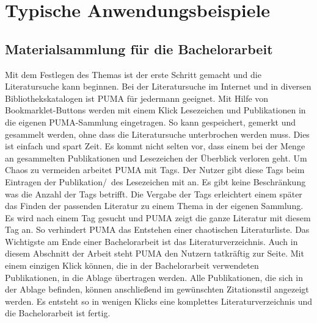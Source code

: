 \chapter{Typische Anwendungsbeispiele}

\section{Materialsammlung für die Bachelorarbeit}
Mit dem Festlegen des Themas ist der erste Schritt gemacht und die Literatursuche kann beginnen. Bei der Literatursuche im Internet und in diversen Bibliothekskatalogen ist PUMA für jedermann geeignet. Mit Hilfe von Bookmarklet-Buttons werden mit einem Klick Lesezeichen und Publikationen in die eigenen PUMA-Sammlung eingetragen. So kann gespeichert, gemerkt und gesammelt werden, ohne dass die Literatursuche unterbrochen werden muss. Dies ist einfach und spart Zeit. 
 \newline
Es kommt nicht selten vor, dass einem bei der Menge an gesammelten Publikationen und Lesezeichen der Überblick verloren geht. Um Chaos zu vermeiden arbeitet PUMA mit Tags. Der Nutzer gibt diese Tags beim Eintragen der Publikation/~des Lesezeichen mit an. Es gibt keine Beschränkung was die Anzahl der Tags betrifft. Die Vergabe der Tags erleichtert einem später das Finden der passenden Literatur zu einem Thema in der eigenen Sammlung. Es wird nach einem Tag gesucht und PUMA zeigt die ganze Literatur mit diesem Tag an. So verhindert PUMA das Entstehen einer chaotischen Literaturliste.
 \newline
Das Wichtigste am Ende einer Bachelorarbeit ist das Literaturverzeichnis. Auch in diesem Abschnitt der Arbeit steht PUMA den Nutzern tatkräftig zur Seite. Mit einem einzigen Klick können, die in der Bachelorarbeit verwendeten Publikationen, in die Ablage übertragen werden. Alle Publikationen, die sich in der Ablage befinden, können anschließend im gewünschten Zitationsstil  angezeigt werden. Es entsteht so in wenigen Klicks eine komplettes Literaturverzeichnis und die  Bachelorarbeit ist fertig.
 
